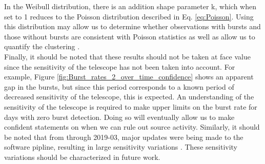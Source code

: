 \documentclass[twocolumn]{aastex631}
\begin{document}
In the Weibull distribution, there is an addition shape parameter k, which when set to 1 reduces to the Poisson distribution described in Eq. \ref{eq:Poisson}. Using this distribution may allow us to determine whether observations with bursts and those without bursts are consistent with Poisson statistics as well as allow us to quantify the clustering \cite{oppermann2018non}.\\
\indent Finally, it should be noted that these results should not be taken at face value since the sensitivity of the telescope has not been taken into account. For example, Figure \ref{fig:Burst_rates_2_over_time_confidence} shows an apparent gap in the bursts, but since this period corresponds to a known period of decreased sensitivity of the telescope, this is expected. An understanding of the sensitivity of the telescope is required to make upper limits on the burst rate for days with zero burst detection. Doing so will eventually allow us to make confident statements on when we can rule out source activity. Similarly, it should be noted that from  through {2019-03}, major updates were being made to the software pipline, resulting in large sensitivity variations \citep{andersen2019chime}. These sensitivity variations should be characterized in future work. 



\newpage



\clearpage
\end{document}
